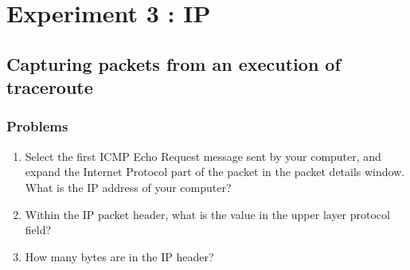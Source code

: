\section{Experiment 3 : IP}
\subsection{Capturing packets from an execution of traceroute}
    \subsubsection*{Problems}
    \begin{enumerate}[label=\bfseries Problem \arabic*:,leftmargin=*,labelindent=1em]
        \item Select the first ICMP Echo Request message sent by your computer, 
        and expand the Internet Protocol part of the packet in the packet details window.
        What is the IP address of your computer?\\[0.2mm]
        \soln
        \item Within the IP packet header, what is the value in the upper layer protocol field?\\[0.2mm]
        \soln
        \item How many bytes are in the IP header?\\[0.2mm]
        \soln

\end{enumerate}
